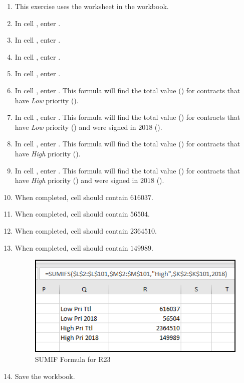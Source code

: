 \begin{enumerate}
	\item This exercise uses the  worksheet in the  workbook.
	\item In cell , enter .
	\item In cell , enter .
	\item In cell , enter .
	\item In cell , enter .
	\item In cell , enter . This formula will find the total value () for contracts that have \textit{Low} priority ().
	\item In cell , enter . This formula will find the total value () for contracts that have \textit{Low} priority () and were signed in $ 2018 $ ().
	\item In cell , enter . This formula will find the total value () for contracts that have \textit{High} priority ().
	\item In cell , enter . This formula will find the total value () for contracts that have \textit{High} priority () and were signed in $ 2018 $ ().
	\item When completed, cell  should contain $ 616037 $.
	\item When completed, cell  should contain $ 56504 $.
	\item When completed, cell  should contain $ 2364510 $.
	\item When completed, cell  should contain $ 149989 $.
	
	\begin{figure}[H]
		\centering
		\includegraphics[width=\maxwidth{.75\linewidth}]{gfx/ch09_fig42}
		\caption{SUMIF Formula for R23}
		\label{09:fig42}
	\end{figure}
	\item Save the  workbook.
	

\end{enumerate}
